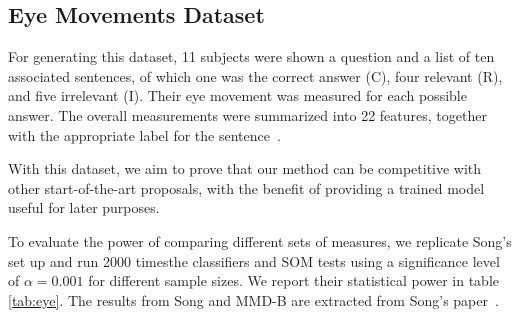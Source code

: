 \subsection{Eye Movements Dataset}
\label{subsec:som_eye}
For generating this dataset, 11 subjects were shown a question and a list of ten 
associated sentences, of which one was the correct answer (C), four relevant (R), and five
irrelevant (I). Their eye movement was measured for each possible answer.
The overall measurements were summarized into 22 features, together with the
appropriate label for the sentence~\cite{salojarvi2005inferring}.

With this dataset, we aim to prove that our method can be competitive with other
start-of-the-art proposals, with the benefit of providing a trained model useful for
later purposes.

To evaluate the power of comparing different sets of measures, we replicate Song's
set up and run 2000 times\footnotemark  the classifiers and \gls{SOM}  tests using a significance
level of $\alpha = 0.001$ for different sample sizes.
We report their statistical power in table \ref{tab:eye}.
The results from Song and MMD-B are extracted from Song's paper~\cite{song2021fast}.


